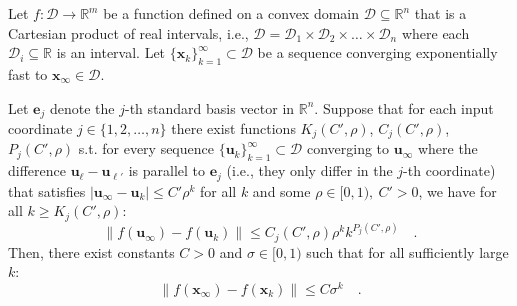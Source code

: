 \documentclass[../../main.tex]{subfiles}
\begin{document}
\begin{theorem}
    \label{theorem:element-wise_exponential_convergence_implies_exponential_convergence}
Let $f: \mathcal{D} \to \mathbb{R}^m$ be a function defined on a convex domain $\mathcal{D} \subseteq \mathbb{R}^n$ that is a Cartesian product of real intervals, i.e., $\mathcal{D} = \mathcal{D}_1 \times \mathcal{D}_2 \times \dots \times \mathcal{D}_n$ where each $\mathcal{D}_i \subseteq \mathbb{R}$ is an interval. Let $\{\bm{x}_k\}_{k=1}^\infty \subset \mathcal{D}$ be a sequence converging exponentially fast to $\bm{x}_\infty \in \mathcal{D}$.

Let $\bm{e}_j$ denote the $j$-th standard basis vector in $\mathbb{R}^n$. Suppose that for each input coordinate $j \in \{1, 2, \dots, n\}$ there exist functions $K_j(C', \rho)$, $C_j(C', \rho)$, $P_j(C', \rho)$ s.t. for every sequence $\{\bm{u}_k\}_{k=1}^\infty \subset \mathcal{D}$ converging to $\bm{u}_\infty$ where the difference $\bm{u}_\ell-\bm{u}_{\ell'}$ is parallel to $\bm{e}_j$ (i.e., they only differ in the $j$-th coordinate) that satisfies $|\bm{u}_\infty - \bm{u}_k| \leq C' \rho^k$ for all $k$ and some $\rho \in [0, 1), \ C' > 0$, we have for all $k \geq K_j(C', \rho)$:
\[
    \|f(\bm{u}_\infty) - f(\bm{u}_k)\| \le C_j(C', \rho) \rho^k k^{P_j(C', \rho)} \quad .
\]
Then, there exist constants $C > 0$ and $\sigma \in [0, 1)$ such that for all sufficiently large $k$:
\[
    \|f(\bm{x}_\infty) - f(\bm{x}_k)\| \le C \sigma^k \quad .
\]
\end{theorem}
\end{document}
